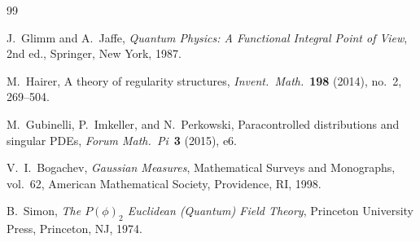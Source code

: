 \documentclass[11pt,a4paper]{article}
\theoremstyle{definition}
\begin{document}
\begin{thebibliography}{99}

J.\ Glimm and A.\ Jaffe,
\textit{Quantum Physics: A Functional Integral Point of View},
2nd ed., Springer, New York, 1987.

M.\ Hairer,
A theory of regularity structures,
\textit{Invent.\ Math.}\ \textbf{198} (2014), no.\ 2, 269--504.

M.\ Gubinelli, P.\ Imkeller, and N.\ Perkowski,
Paracontrolled distributions and singular PDEs,
\textit{Forum Math.\ Pi}\ \textbf{3} (2015), e6.

V.\ I.\ Bogachev,
\textit{Gaussian Measures},
Mathematical Surveys and Monographs, vol.\ 62,
American Mathematical Society, Providence, RI, 1998.

B.\ Simon,
\textit{The $P(\phi)_2$ Euclidean (Quantum) Field Theory},
Princeton University Press, Princeton, NJ, 1974.

\end{thebibliography}
\end{document}
